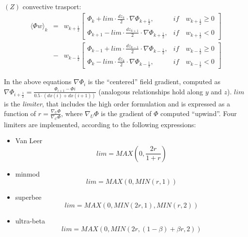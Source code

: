 $(Z)$ convective trasport:
\begin{eqnarray}
\langle \Phi w \rangle_{k} & = & w_{k+\frac{1}{2}}
\left[ \begin{array}{cc}
\displaystyle{\Phi_{k} +lim \cdot\frac{dz_k}{2} \cdot \nabla\Phi_{k+\frac{1}{2}}}, & \textstyle{if} \quad w_{k+\frac{1}{2}}  \ge 0 \\
\displaystyle{\Phi_{k+1} -lim \cdot\frac{dz_{k+1}}{2} \cdot \nabla\Phi_{k+\frac{1}{2}}}, & \textstyle{if} \quad w_{k+\frac{1}{2}} < 0
\end{array} \right] \\ \nonumber
%
                               & - & w_{k-\frac{1}{2}}
\left[ \begin{array}{cc}
\displaystyle{\Phi_{k-1} +lim \cdot\frac{dz_{k-1}}{2} \cdot \nabla\Phi_{k-\frac{1}{2}}}, & \textstyle{if} \quad w_{k-\frac{1}{2}}  \ge 0 \\
\displaystyle{\Phi_{k} -lim \cdot\frac{dz_k}{2} \cdot \nabla\Phi_{k-\frac{1}{2}}}, & \textstyle{if} \quad w_{k-\frac{1}{2}} < 0
\end{array} \right] \nonumber
%
\end{eqnarray}

In the above equations $\nabla\Phi_i$ is the ``centered'' field gradient, computed as $\nabla\Phi_{i+\frac{1}{2}}= \frac{\Phi_{i+1}-\Phi{i}}{0.5\cdot(dx(i)+dx(i+1))} $ (analogous relationships hold along $y$ and $z$). $lim$ is the {\em limiter}, that includes the high order formulation and is expressed as a function
of $r=\frac{\nabla_U\Phi}{\nabla_C\Phi}$, where $\nabla_U\Phi$ is the gradient 
of $\Phi$ computed ``upwind''. Four limiters are implemented, according to the
following expressions:
\begin{itemize}
\item  Van Leer
\begin{equation}
lim = MAX( 0, \frac{2r}{1+r} )
\end{equation}
\item minmod
\begin{equation}
lim = MAX( 0, MIN( r, 1 ))
\end{equation}
\item superbee
\begin{equation}
lim = MAX( 0, MIN( 2r, 1 ), MIN( r, 2 ))
\end{equation}
\item ultra-beta
\begin{equation}
lim = MAX( 0, MIN( 2r, (1-\beta)+\beta r, 2 ))
\end{equation}
\end{itemize}
%
\newpage
%
